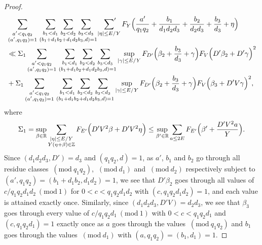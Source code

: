 \documentclass[10pt]{amsart}
\theoremstyle{plain}
\numberwithin{sblmm}{thrm}
\numberwithin{equation}{section}
\newcommand{\Mod}[1]{\ (\mathrm{mod}\ #1)}
\begin{document}
\begin{proof}
\begin{align*}
&\sum_{\substack{a'< q_1q_2\\ (a',q_1q_2)=1}}\,\underset{(b_1+d_1b_2+d_1d_2b_3,d)=1}{\sum_{b_1< d_1}\,\sum_{b_2< d_2}\,\sum_{b_3< d_3}}\,\sideset{}{'}\sum_{|\eta|\le E/Y}F_Y\Bigl(\frac{a'}{q_1q_2}+\frac{b_1}{d_1d_2d_3}+\frac{b_2}{d_2d_3}+\frac{b_3}{d_3}+\eta\Bigr)\\
&\ll \Sigma_1 \sum_{\substack{a'< q_1q_2\\ (a',q_1q_2)=1}}\,\underset{(b_1+d_1b_2+d_1d_2b_3,d)=1}{\sum_{b_1< d_1}\,\sum_{b_2< d_2}\,\sum_{b_3< d_3}}\sup_{|\gamma|\le E/Y}F_{D'}\Bigl(\beta_2+\frac{b_3}{d_3}+\gamma\Bigr)F_V\Bigl(D'\beta_2+D' \gamma\Bigr)^2\\
&+\Sigma_1 \sum_{\substack{a'< q_1q_2\\ (a',q_1q_2)=1}}\,\underset{(b_1+d_1b_2+d_1d_2b_3,d)=1}{\sum_{b_1< d_1}\,\sum_{b_2< d_2}\,\sum_{b_3< d_3}}\sup_{|\gamma|\le E/Y}F_{D'}\Bigl(\beta_2+\frac{b_3}{d_3}+\gamma\Bigr)F_V\Big(\beta_3+D' V\gamma\Bigr)^2,
\end{align*}
where
\[
\Sigma_1=\sup_{\beta\in\mathbb{R}}\sum_{\substack{|\eta|\le E/Y\\ Y(\eta+\beta)\in\mathbb{Z}}}F_{E'}\Bigl(D' V^2\beta+D' V^2\eta\Bigr)\le\sup_{\beta'\in\mathbb{R}}\sum_{a\le 2E}F_{E'}\Bigl(\beta'+\frac{D' V^2 a}{Y}\Bigr).
\]
Since $(d_1d_2d_3,D')=d_3$ and $(q_1q_2,d)=1$, as $a'$, $b_1$ and $b_2$ go through all residue classes $\Mod{q_1q_2}$, $\Mod{d_1}$ and $\Mod{d_2}$ respectively subject to $(a',q_1q_2)=(b_1+d_1b_2,d_1d_2)=1$, we see that $D'\beta_2$ goes through all values of $c/q_1q_2d_1d_2\Mod{1}$ for $0< c< q_1q_2d_1d_2$ with $(c,q_1q_2d_1d_2)=1$, and each value is attained exactly once. Similarly, since $(d_1d_2d_3,D' V)=d_2d_3$, we see that $\beta_3$ goes through every value of $c/q_1q_2d_1\Mod{1}$ with $0 < c< q_1q_2d_1$ and $(c,q_1q_2d_1)=1$ exactly once as $a$ goes through the values $\Mod{q_1q_2}$ and $b_1$ goes through the values $\Mod{d_1}$ with $(a,q_1q_2)=(b_1,d_1)=1$.


\end{proof}
\end{document}
